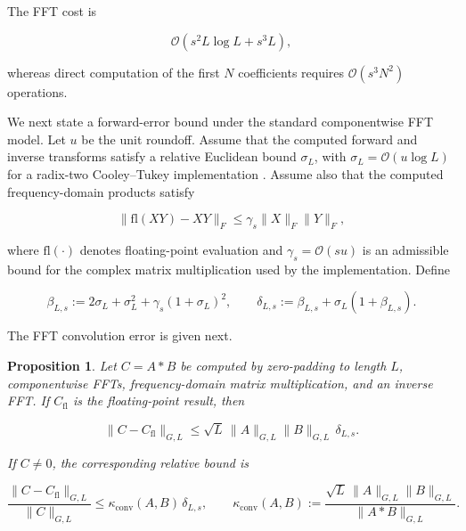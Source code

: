 \documentclass[3p,12pt,authoryear]{elsarticle}
\newtheorem{proposition}[theorem]{Proposition}
\theoremstyle{definition}
\theoremstyle{remark}
\newcommand{\fl}{\mathrm{fl}}
\begin{document}
The FFT cost is

\begin{equation}\label{eq:fft-complexity}
\mathcal O(s^2L\log L+s^3L),
\end{equation}

whereas direct computation of the first $N$ coefficients requires $\mathcal O(s^3N^2)$ operations.

We next state a forward-error bound under the standard componentwise FFT model. Let $u$ be the unit roundoff. Assume that the computed forward and inverse transforms satisfy a relative Euclidean bound $\sigma_L$, with $\sigma_L=\mathcal O(u\log L)$ for a radix-two Cooley--Tukey implementation \citep{Higham2002}. Assume also that the computed frequency-domain products satisfy

\begin{equation*}
\|\fl(XY)-XY\|_F
\leq
\gamma_s\|X\|_F\|Y\|_F,
\end{equation*}

where $\fl(\cdot)$ denotes floating-point evaluation and $\gamma_s=\mathcal O(su)$ is an admissible bound for the complex matrix multiplication used by the implementation. Define

\begin{equation*}
\beta_{L,s}:=2\sigma_L+\sigma_L^2+\gamma_s(1+\sigma_L)^2,
\qquad
\delta_{L,s}:=\beta_{L,s}+\sigma_L(1+\beta_{L,s}).
\end{equation*}


The FFT convolution error is given next.

\begin{proposition}\label{prop:fft-error}
Let $C=A*B$ be computed by zero-padding to length $L$, componentwise FFTs, frequency-domain matrix multiplication, and an inverse FFT. If $C_{\fl}$ is the floating-point result, then

\begin{equation}\label{eq:fft-forward-error}
\|C-C_{\fl}\|_{G,L}
\leq
\sqrt L\,\|A\|_{G,L}\|B\|_{G,L}\,\delta_{L,s}.
\end{equation}

If $C\neq0$, the corresponding relative bound is

\begin{equation}\label{eq:fft-relative-error}
\frac{\|C-C_{\fl}\|_{G,L}}{\|C\|_{G,L}}
\leq
\kappa_{\mathrm{conv}}(A,B)\,\delta_{L,s},
\qquad
\kappa_{\mathrm{conv}}(A,B)
:=
\frac{\sqrt L\,\|A\|_{G,L}\|B\|_{G,L}}{\|A*B\|_{G,L}}.
\end{equation}

\end{proposition}
\end{document}
